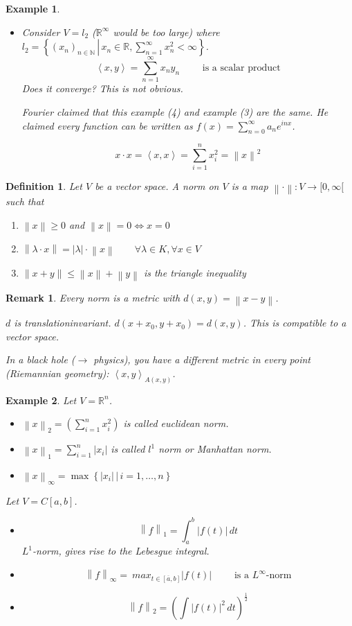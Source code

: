 \documentclass{article}
\newtheorem{example}{Example}  \numberwithin{example}{section}
\newtheorem{definition}{Definition}  \numberwithin{definition}{section}
\newtheorem{remark}{Remark}  \numberwithin{remark}{section}
\newcommand{\setdef}[2]{\left\{\left.#1\,\right|\,#2\right\}}
\newcommand{\angel}[1]{\left\langle#1\right\rangle}
\newcommand{\norm}[1]{\left\|#1\right\|}
\newcommand{\card}[1]{\left|#1\right|}
\begin{document}
\begin{example}
\begin{itemize}
    \item
      Consider $V = l_2$ ($\mathbb R^{\infty}$ would be too large) where $l_2 = \setdef{(x_n)_{n\in\mathbb N}}{x_n \in \mathbb R, \sum_{n=1}^\infty x_n^2 < \infty}$.
      \[ \angel{x, y} = \sum_{n=1}^\infty x_n y_n \qquad \text{ is a scalar product} \]
      Does it converge? This is not obvious.

      Fourier claimed that this example (4) and example (3) are the same.
      He claimed every function can be written as $f(x) = \sum_{n=0}^\infty a_n e^{inx}$.

      \[ x \cdot x = \angel{x, x} = \sum_{i=1}^n x_i^2 = \norm{x}^2 \]
  \end{itemize}
\end{example}

\begin{definition}
  Let $V$ be a vector space.
  A \emph{norm} on $V$ is a map $\norm{\cdot}: V \to [0,\infty[$
  such that
  \begin{enumerate}
    \item $\norm{x} \geq 0$ and $\norm{x} = 0 \iff x = 0$
    \item $\norm{\lambda \cdot x} = \card{\lambda} \cdot \norm{x} \qquad \forall \lambda \in K, \forall x \in V$
    \item $\norm{x + y} \leq \norm{x} + \norm{y}$ is the triangle inequality
  \end{enumerate}
\end{definition}

\begin{remark}
  Every norm is a metric with $d(x,y) = \norm{x - y}$.

  $d$ is translationinvariant. $d(x + x_0, y + x_0) = d(x, y)$.
  This is compatible to a vector space.

  In a black hole ($\to$ physics), you have a different metric in every point (Riemannian geometry): $\angel{x,y}_{A(x,y)}$.
\end{remark}

\begin{example}
  Let $V = \mathbb R^n$.
  \begin{itemize}
    \item $\norm{x}_2 = \left(\sum_{i=1}^n x_i^2\right)$ is called \emph{euclidean norm}.
    \item $\norm{x}_1 = \sum_{i=1}^n \card{x_i}$ is called \emph{$l^1$ norm} or \emph{Manhattan norm}.
    \item $\norm{x}_{\infty} = \max\setdef{\card{x_i}}{i = 1, \dots, n}$
  \end{itemize}
  Let $V = C[a,b]$.
  \begin{itemize}
    \item \[ \norm{f}_1 = \int_a^b \card{f(t)} \, dt \]
      $L^1$-norm, gives rise to the Lebesgue integral.
    \item \[ \norm{f}_\infty =\ max_{t \in [\overline{a}, b]} \card{f(t)} \qquad \text{ is a $L^\infty$-norm} \]
    \item \[ \norm{f}_2 = \left(\int \card{f(t)}^2 \, dt \right)^{\frac12} \]
  \end{itemize}
\end{example}
\end{document}
